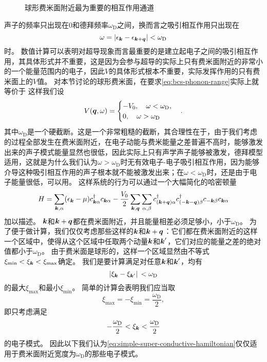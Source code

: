 \begin{figure}
    \centering
    
    \caption{球形费米面附近最为重要的相互作用通道}
\end{figure}

声子的频率只出现在0和德拜频率$\omega_\text{D}$之间，换而言之吸引相互作用只出现在
\begin{equation}
    \omega = \abs{\epsilon_{\vb*{k}} - \epsilon_{\vb*{k}+\vb*{q}}} < \omega_\text{D}
    \label{eq:bcs-phonon-range}
\end{equation}
时。
数值计算可以表明对超导现象而言最重要的是建立起电子之间的吸引相互作用，其具体形式并不重要，这是因为会参与超导的实际上只有费米面附近的非常小的一个能量范围内的电子，因此$V$的具体形式根本不重要，实际发挥作用的只有费米面上的$V$值。
对本节讨论的球形费米面，在要求\eqref{eq:bcs-phonon-range}实际上就等价于
这样我们设
\begin{equation}
    V(\vb*{q}, \omega) = \begin{cases}
        - V_0, \quad \omega < \omega_\text{D}, \\
        0, \quad \omega > \omega_\text{D}
    \end{cases}.
    \label{eq:superconductive-interaction-simplified}
\end{equation}
其中$\omega_\text{D}$是一个硬截断。这是一个非常粗糙的截断，其合理性在于，由于我们考虑的过程全部发生在费米面附近，在电子动能与费米能量之差普遍不高时，能够激发出来的声子模式能量显然也很低，因此实际上只有声学声子能够被激发，德拜模型适用，这就是为什么我们认为$\omega > \omega_\text{D}$时无有效电子-电子吸引相互作用，因为能够介导这种吸引相互作用的声子根本就不能被激发出来；在$\omega < \omega_\text{D}$时，还是由于电子能量很低，可以用。
这样系统的行为可以通过一个大幅简化的哈密顿量
\begin{equation}
    {H} = \sum_{\vb*{k}, \alpha} (\epsilon_{\vb*{k}} - \mu) {c}_{\vb*{k} \alpha}^\dagger {c}_{\vb*{k} \alpha} - \frac{V_0}{2} \sum_{\vb*{k}, \vb*{q}} \sum_{\alpha, \beta} {c}^\dagger_{(\vb*{k} + \vb*{q}) \alpha} {c}^\dagger_{( - \vb*{k} - \vb*{q}) \beta} {c}_{-\vb*{k} \beta} {c}_{\vb*{k} \alpha}
    \label{eq:simple-super-conductive-hamiltonian}
\end{equation}
加以描述。
$\vb*{k}$和$\vb*{k}+\vb*{q}$都在费米面附近，并且能量相差必须足够小，小于$\omega_\text{D}$。
为了便于做计算，我们仅仅考虑那些这样的$\vb*{k}$和$\vb*{k}+\vb*{q}$：它们都在费米面附近的这样一个区域中，使得从这个区域中任取两个动量$\vb*{k}$和$\vb*{k}'$，它们对应的能量之差的绝对值都小于$\omega_\text{D}$。
由于费米面是球形的，这样一个区域显然由不等式$\xi_\text{min} < \xi_{\vb*{k}} < \xi_\text{max}$确定。
我们是要计算满足对任意$\vb*{k}$和$\vb*{k}'$，均有
\[
    \abs*{\xi_{\vb*{k}} - \xi_{\vb*{k}'}} < \omega_\text{D}
\]
的最大$\xi_{\text{max}}$和最小$\xi_\text{min}$。
简单的计算会表明我们应当取
\[
    \xi_\text{max} = - \xi_\text{min} = \frac{\omega_\text{D}}{2},
\]
即只考虑满足
\begin{equation}
    - \frac{\omega_\text{D}}{2} < \xi_{\vb*{k}} < \frac{\omega_\text{D}}{2}
    \label{eq:bcs-small-sphere-around-fermi-surface}
\end{equation}
的电子模式。
因此以下我们认为\eqref{eq:simple-super-conductive-hamiltonian}仅仅适用于费米面附近宽度为$\omega_\text{D}$的那些电子模式。

